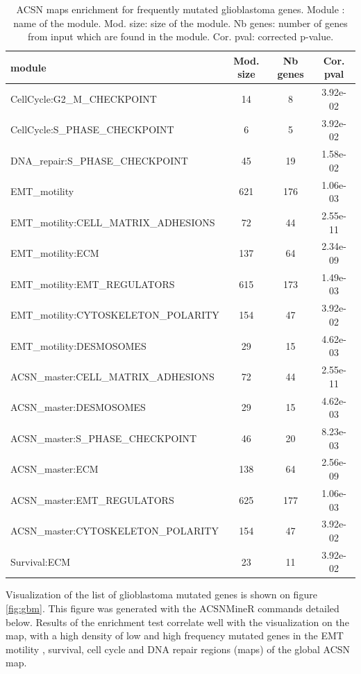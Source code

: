 \documentclass[article]{jss}
\begin{document}
\begin{table}[h!]
  \centering
  \caption{ACSN maps enrichment for frequently mutated glioblastoma genes.
  Module : name of the module. Mod. size: size of the module. Nb genes: number
  of genes from input which are found in the module. Cor. pval: corrected
  p-value.} 
  \label{tab:table_gbm}

\begin{tabular}{l|c|c|c}
\hline
module & Mod. size & Nb genes & Cor. pval\\ 
\hline
CellCycle:G2\_M\_CHECKPOINT & 14 & 8 & 3.92e-02\\
CellCycle:S\_PHASE\_CHECKPOINT & 6 & 5 & 3.92e-02\\
DNA\_repair:S\_PHASE\_CHECKPOINT & 45 & 19 & 1.58e-02\\
EMT\_motility & 621 & 176 & 1.06e-03\\
EMT\_motility:CELL\_MATRIX\_ADHESIONS & 72 & 44 & 2.55e-11\\
EMT\_motility:ECM & 137 & 64 & 2.34e-09\\
EMT\_motility:EMT\_REGULATORS & 615 & 173 & 1.49e-03\\
EMT\_motility:CYTOSKELETON\_POLARITY & 154 & 47 & 3.92e-02\\
EMT\_motility:DESMOSOMES & 29 & 15 & 4.62e-03\\
ACSN\_master:CELL\_MATRIX\_ADHESIONS & 72 & 44 & 2.55e-11\\
ACSN\_master:DESMOSOMES & 29 & 15 & 4.62e-03\\
ACSN\_master:S\_PHASE\_CHECKPOINT & 46 & 20 & 8.23e-03\\
ACSN\_master:ECM & 138 & 64 & 2.56e-09\\
ACSN\_master:EMT\_REGULATORS & 625 & 177 & 1.06e-03\\
ACSN\_master:CYTOSKELETON\_POLARITY & 154 & 47 & 3.92e-02\\
Survival:ECM & 23 & 11 & 3.92e-02\\
\hline
\end{tabular}
\end{table}

Visualization of the list of glioblastoma mutated genes is shown on figure
\ref{fig:gbm}. This figure was generated with the ACSNMineR commands detailed
below. Results of the enrichment test correlate well with the visualization on
the map, with a high density of low and high frequency mutated genes in the EMT
motility , survival, cell cycle and DNA repair regions (maps) of the global ACSN
map.
\end{document}

